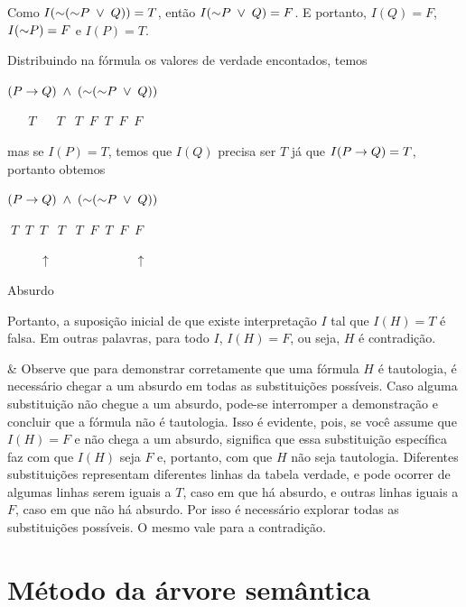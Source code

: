 \begin{easylist}
  Como $I( \mathord{\sim}( \mathord{\sim} P \;\lor\; Q) ) = T$, então $I( \mathord{\sim} P \;\lor\; Q) = F$. E portanto, $I(Q) = F$, $I(\mathord{\sim} P) = F$ e $I(P) = T$.

  Distribuindo na fórmula os valores de verdade encontados, temos

$    (P \rightarrow Q) \;\land\; ( \mathord{\sim}( \mathord{\sim} P \;\lor\; Q))    $

$ \;\;\;\;\;\;    T \hspace{20pt}                   T \;\;\; T \;\;  F \;\;  T \;\;  F \;\;  F  $

mas se $I(P) = T$, temos que $I(Q)$ precisa ser $T$ já que $I(P \rightarrow Q) = T$, portanto obtemos

$    (P \rightarrow Q) \;\land\; ( \mathord{\sim}( \mathord{\sim} P \;\lor\; Q))    $

$ \; T \;\;  T \;\; T \;\;\;                      T \;\;\; T \;\;  F \;\;  T \;\;  F \;\;  F  $

$ \hspace{30pt} \uparrow \hspace{78pt} \uparrow $

\hspace{50pt} Absurdo

Portanto, a suposição inicial de que existe interpretação $I$ tal que $I(H) = T$ é falsa. Em outras palavras, para todo $I$, $I(H)=F$, ou seja, $H$ é contradição.

  & Observe que para demonstrar corretamente que uma fórmula $H$ é tautologia, é necessário chegar a um absurdo em todas as substituições possíveis. Caso alguma substituição não chegue a um absurdo, pode-se interromper a demonstração e concluir que a fórmula não é tautologia. Isso é evidente, pois, se você assume que $I(H) = F$ e não chega a um absurdo, significa que essa substituição específica faz com que $I(H)$ seja $F$ e, portanto, com que $H$ não seja tautologia. Diferentes substituições representam diferentes linhas da tabela verdade, e pode ocorrer de algumas linhas serem iguais a $T$, caso em que há absurdo, e outras linhas iguais a $F$, caso em que não há absurdo. Por isso é necessário explorar todas as substituições possíveis.  O mesmo vale para a contradição.



\end{easylist}


\section{Método da árvore semântica}

